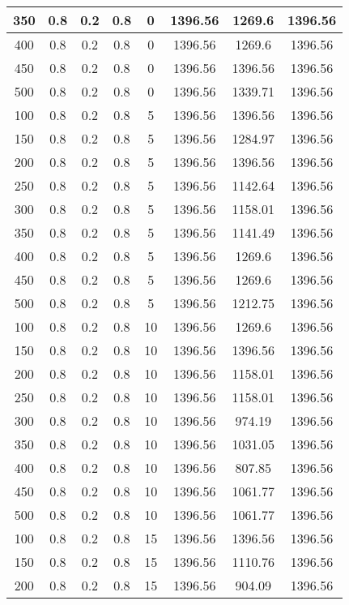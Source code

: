 \documentclass[a4paper, 12pt]{extreport}
\begin{document}
\begin{itemize}
\begin{longtable}{|c|c|c|c|c|c|c|c|}
			350 & 0.8 & 0.2 & 0.8 & 0 & 1396.56 & 1269.6 & 1396.56 \\\hline
			400 & 0.8 & 0.2 & 0.8 & 0 & 1396.56 & 1269.6 & 1396.56 \\\hline
			450 & 0.8 & 0.2 & 0.8 & 0 & 1396.56 & 1396.56 & 1396.56 \\\hline
			500 & 0.8 & 0.2 & 0.8 & 0 & 1396.56 & 1339.71 & 1396.56 \\\hline
			100 & 0.8 & 0.2 & 0.8 & 5 & 1396.56 & 1396.56 & 1396.56 \\\hline
			150 & 0.8 & 0.2 & 0.8 & 5 & 1396.56 & 1284.97 & 1396.56 \\\hline
			200 & 0.8 & 0.2 & 0.8 & 5 & 1396.56 & 1396.56 & 1396.56 \\\hline
			250 & 0.8 & 0.2 & 0.8 & 5 & 1396.56 & 1142.64 & 1396.56 \\\hline
			300 & 0.8 & 0.2 & 0.8 & 5 & 1396.56 & 1158.01 & 1396.56 \\\hline
			350 & 0.8 & 0.2 & 0.8 & 5 & 1396.56 & 1141.49 & 1396.56 \\\hline
			400 & 0.8 & 0.2 & 0.8 & 5 & 1396.56 & 1269.6 & 1396.56 \\\hline
			450 & 0.8 & 0.2 & 0.8 & 5 & 1396.56 & 1269.6 & 1396.56 \\\hline
			500 & 0.8 & 0.2 & 0.8 & 5 & 1396.56 & 1212.75 & 1396.56 \\\hline
			100 & 0.8 & 0.2 & 0.8 & 10 & 1396.56 & 1269.6 & 1396.56 \\\hline
			150 & 0.8 & 0.2 & 0.8 & 10 & 1396.56 & 1396.56 & 1396.56 \\\hline
			200 & 0.8 & 0.2 & 0.8 & 10 & 1396.56 & 1158.01 & 1396.56 \\\hline
			250 & 0.8 & 0.2 & 0.8 & 10 & 1396.56 & 1158.01 & 1396.56 \\\hline
			300 & 0.8 & 0.2 & 0.8 & 10 & 1396.56 & 974.19 & 1396.56 \\\hline
			350 & 0.8 & 0.2 & 0.8 & 10 & 1396.56 & 1031.05 & 1396.56 \\\hline
			400 & 0.8 & 0.2 & 0.8 & 10 & 1396.56 & 807.85 & 1396.56 \\\hline
			450 & 0.8 & 0.2 & 0.8 & 10 & 1396.56 & 1061.77 & 1396.56 \\\hline
			500 & 0.8 & 0.2 & 0.8 & 10 & 1396.56 & 1061.77 & 1396.56 \\\hline
			100 & 0.8 & 0.2 & 0.8 & 15 & 1396.56 & 1396.56 & 1396.56 \\\hline
			150 & 0.8 & 0.2 & 0.8 & 15 & 1396.56 & 1110.76 & 1396.56 \\\hline
			200 & 0.8 & 0.2 & 0.8 & 15 & 1396.56 & 904.09 & 1396.56 \\\hline

\end{longtable}
\end{itemize}
\end{document}
